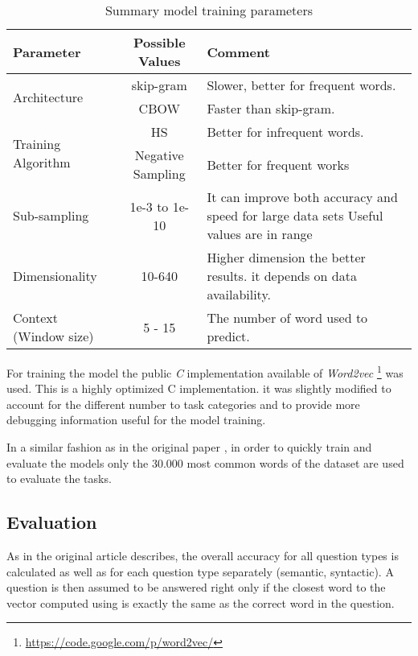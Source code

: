 \begin{table}[h]
   \centering
   \caption{Summary model training parameters} 
   \label{tab:word2_vec_parameters}
   
   \small
   \begin{tabular}{ |l|c|p{5cm}| }
   \hline           
    Parameter &  Possible Values & Comment \\  \hline           
    \multirow{2}{*}{Architecture}  & skip-gram  & Slower, better for frequent
    words. \\ 
    \cline{2-3}
    & \ac{CBOW}  &  Faster than skip-gram. \\ \hline
    \multirow{2}{*}{Training Algorithm}  & \ac{HS}  & Better for infrequent words.   \\ 
    \cline{2-3}
    & Negative Sampling & Better for frequent works \\ \hline
    Sub-sampling  & 1e-3 to 1e-10  &  It  can improve both accuracy and speed for large data
    sets Useful values are in range \\ \hline
    Dimensionality  & 10-640 & Higher dimension the better results. 
    it depends on data availability.  \\ \hline
    Context (Window size)  & 5 - 15 & The number of word used to predict. \\ \hline

    
\end{tabular}
\end{table}

For training  the model the public \emph{C} implementation available of
\textit{Word2vec} \footnote{\url{https://code.google.com/p/word2vec/}} was
used.  This is a highly optimized C implementation. it was slightly modified to account for the different
number to task categories and to provide more debugging information useful
for the model training. 

In a similar fashion as in the original paper
\cite{DBLP:journals/corr/abs-1301-3781}, in order to quickly train and evaluate the models
only the 30.000 most common words of the dataset are used to evaluate the tasks. 

\subsection{Evaluation}
\label{experiments:sub:evaluation}

As in the original article describes, the overall accuracy for all question
types is calculated as well as  for each question type separately (semantic,
syntactic). A question is then assumed to be answered right  only if the
closest word to the vector computed using  is exactly the same as the correct word in the
question. 
 

